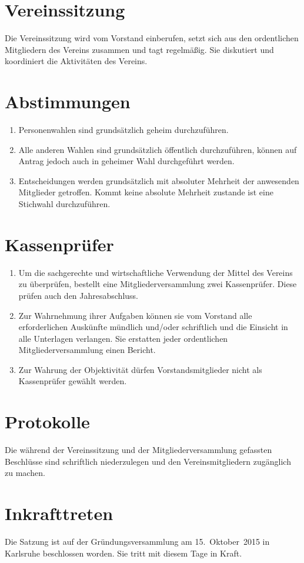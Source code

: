 \documentclass[a4paper]{scrartcl}
\newcommand\Gruendungsdatum{15.~Oktober~2015}
\begin{document}
\section{Vereinssitzung}
Die Vereinssitzung wird vom Vorstand einberufen, setzt sich aus den
ordentlichen Mitgliedern des Vereins zusammen und tagt regelmäßig. Sie
diskutiert und koordiniert die Aktivitäten des Vereins.

\section{Abstimmungen}
\begin{enumerate}
    \item Personenwahlen sind grundsätzlich geheim durchzuführen.
    \item Alle anderen Wahlen sind grundsätzlich öffentlich durchzuführen,
          können auf Antrag jedoch auch in geheimer Wahl durchgeführt werden.
    \item Entscheidungen werden grundsätzlich mit absoluter Mehrheit der
          anwesenden Mitglieder getroffen. Kommt keine absolute Mehrheit
          zustande ist eine Stichwahl durchzuführen.
\end{enumerate}

\section{Kassenprüfer}
\begin{enumerate}
    \item Um die sachgerechte und wirtschaftliche Verwendung der Mittel des
          Vereins zu überprüfen, bestellt eine Mitgliederversammlung zwei
          Kassenprüfer. Diese prüfen auch den Jahresabschluss.
    \item Zur Wahrnehmung ihrer Aufgaben können sie vom Vorstand alle
          erforderlichen Auskünfte mündlich und/oder schriftlich und die
          Einsicht in alle Unterlagen verlangen. Sie erstatten jeder
          ordentlichen Mitgliederversammlung einen Bericht.
    \item Zur Wahrung der Objektivität dürfen Vorstandsmitglieder nicht als
          Kassenprüfer gewählt werden.
\end{enumerate}

\section{Protokolle}
Die während der Vereinssitzung und der Mitgliederversammlung gefassten
Beschlüsse sind schriftlich niederzulegen und den Vereinsmitgliedern
zugänglich zu machen.

\section{Inkrafttreten}
Die Satzung ist auf der Gründungsversammlung am \Gruendungsdatum{} in Karlsruhe
beschlossen worden. Sie tritt mit diesem Tage in Kraft.

\end{document}
